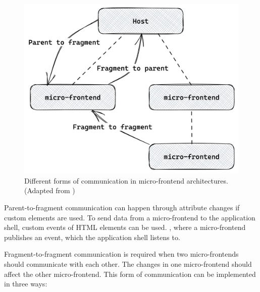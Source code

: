 \ifshowImages
\begin{figure}[H]
  \centering
  \includegraphics[width=0.5\linewidth]{images/background/micro-frontends/communication/communication-patterns.png}
  \caption{Different forms of communication in micro-frontend architectures. (Adapted from \cite[100]{book:2020:geers:background:micro-frontends:micro-frontends-in-action})}\label{fig:background:micro-frontend:communication:communication-patterns}
\end{figure}
\fi

\noindent Parent-to-fragment communication can happen through attribute changes if custom elements are used. \cite[58-59]{book:2019:farrell:background:micro-frontends:web-components-in-action} To send data from a micro-frontend to the application shell, custom events of \ac{HTML} elements can be used. \cite[315]{book:2019:farrell:background:micro-frontends:web-components-in-action}, where a micro-frontend publishes an event, which the application shell listens to. \cite{book:2020:geers:background:micro-frontends:micro-frontends-in-action}

\bigskip

\noindent Fragment-to-fragment communication is required when two micro-frontends should communicate with each other. The changes in one micro-frontend should affect the other micro-frontend. This form of communication can be implemented in three ways: \cite[107-108]{book:2020:geers:background:micro-frontends:micro-frontends-in-action}

